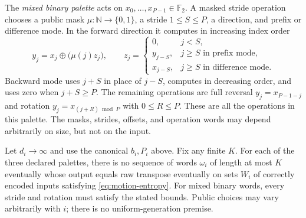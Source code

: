 The \emph{mixed binary palette} acts on $x_0,\ldots,x_{P-1}\in\mathbb F_2$.
A masked stride operation chooses a public mask $\mu:\mathbb N\to\{0,1\}$,
a stride $1\le S\le P$, a direction, and prefix or difference mode.  In the
forward direction it computes in increasing index order
\[
 y_j=x_j\oplus\bigl(\mu(j)z_j\bigr),\qquad
 z_j=\begin{cases}
 0,&j<S,\\
 y_{j-S},&j\ge S\text{ in prefix mode},\\
 x_{j-S},&j\ge S\text{ in difference mode}.
 \end{cases}
\]
Backward mode uses $j+S$ in place of $j-S$, computes in decreasing order,
and uses zero when $j+S\ge P$.  The remaining operations are full reversal
$y_j=x_{P-1-j}$ and rotation $y_j=x_{(j+R)\bmod P}$ with $0\le R\le P$.
These are all the operations in this palette.  The masks, strides, offsets,
and operation words may depend arbitrarily on size, but not on the input.

\begin{theorem}
\label{thm:motion-palettes}
Let $d_i\to\infty$ and use the canonical $b_i,P_i$ above.  Fix any finite $K$.
For each of the three declared palettes, there is no sequence of words
$\omega_i$ of length at most $K$ eventually whose output equals raw transpose
eventually on sets $W_i$ of correctly encoded inputs satisfying
\eqref{eq:motion-entropy}.  For mixed binary words,
every stride and rotation must satisfy the stated bounds.  Public choices
may vary arbitrarily with $i$; there is no uniform-generation premise.
\end{theorem}


